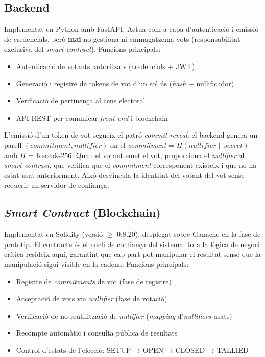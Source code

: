 \documentclass[12pt,a4paper,catalan]{article}
\begin{document}
\subsection{Backend}

Implementat en Python amb FastAPI. Actua com a capa d'autenticació i emissió de credencials, però \textbf{mai} no gestiona ni emmagatzema vots (responsabilitat exclusiva del \textit{smart contract}). Funcions principals:

\begin{itemize}
    \item Autenticació de votants autoritzats (credencials + JWT)
    \item Generació i registre de tokens de vot d'un sol ús (\textit{hash} + nullificador)
    \item Verificació de pertinença al cens electoral
    \item API REST per comunicar \textit{front-end} i blockchain
\end{itemize}

L'emissió d'un token de vot segueix el patró \textit{commit-reveal}: el backend genera un parell $(\textit{commitment}, \textit{nullifier})$ on el \textit{commitment} = $H(\textit{nullifier} \| \textit{secret})$ amb $H$ = Keccak-256. Quan el votant emet el vot, proporciona el \textit{nullifier} al \textit{smart contract}, que verifica que el \textit{commitment} corresponent existeix i que no ha estat usat anteriorment. Això desvincula la identitat del votant del vot sense requerir un servidor de confiança.

\subsection{\textit{Smart Contract} (Blockchain)}

Implementat en Solidity (versió $\geq$ 0.8.20), desplegat sobre Ganache en la fase de prototip. El contracte és el nucli de confiança del sistema: tota la lògica de negoci crítica resideix aquí, garantint que cap part pot manipular el resultat sense que la manipulació sigui visible en la cadena. Funcions principals:

\begin{itemize}
    \item Registre de \textit{commitments} de vot (fase de registre)
    \item Acceptació de vots via \textit{nullifier} (fase de votació)
    \item Verificació de no-reutilització de \textit{nullifier} (\textit{mapping} d'\textit{nullifiers} usats)
    \item Recompte automàtic i consulta pública de resultats
    \item Control d'estats de l'elecció: SETUP → OPEN → CLOSED → TALLIED
\end{itemize}
\end{document}
